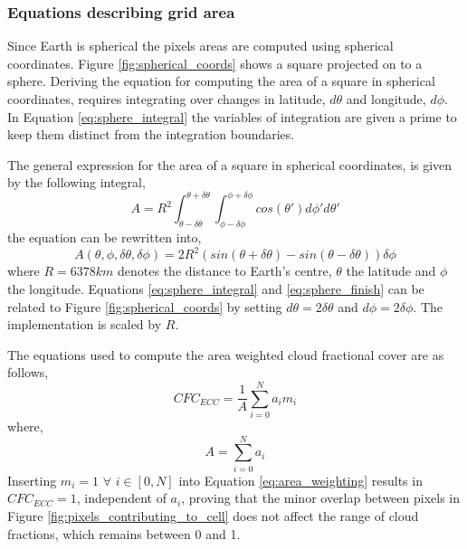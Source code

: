 \subsubsection{Equations describing grid area}
Since Earth is spherical the pixels areas are computed using spherical coordinates. Figure \ref{fig:spherical_coords} shows a square projected on to a sphere. Deriving the equation for computing the area of a square in spherical coordinates, requires integrating over changes in latitude, $d\theta$ and longitude, $d\phi$. In Equation \eqref{eq:sphere_integral} the variables of integration are given a prime to keep them distinct from the integration boundaries.

The general expression for the area of a square in spherical coordinates, is given by the following integral,
\begin{equation} \label{eq:sphere_integral}
    A = R^2\int_{ \theta - \delta \theta }^{\theta + \delta \theta} \int_{ \phi - \delta \phi }^{\phi + \delta \phi} cos\left( \theta' \right) d\phi' d\theta'
\end{equation}
the equation can be rewritten into,
\begin{equation} \label{eq:sphere_finish}
    A \left( \theta, \phi, \delta \theta, \delta \phi   \right)= 2R^2 \left( sin\left( \theta + \delta \theta  \right) - sin\left(  \theta - \delta \theta  \right) \right) \delta \phi
\end{equation}
where $R=6378km$ denotes the distance to Earth's centre, $\theta$ the latitude and $\phi$ the longitude. Equations \eqref{eq:sphere_integral} and \eqref{eq:sphere_finish} can be related to Figure \ref{fig:spherical_coords} by setting $d \theta = 2 \delta \theta$ and $d \phi = 2 \delta \phi$. The implementation is scaled by $R$.

The equations used to compute the area weighted cloud fractional cover are as follows,
\begin{equation} \label{eq:area_weighting}
    CFC_{ECC} = \frac{1}{A} \sum_{i=0}^{N} a_i m_i
\end{equation}
where,
\begin{equation} \label{eq:tot_area}
    A = \sum_{i=0}^{N} a_i
\end{equation}
Inserting $m_i = 1$ $\forall$ $i \in [0,N]$ into Equation \eqref{eq:area_weighting} results in $CFC_{ECC}=1$, independent of $a_i$, proving that the minor overlap between pixels in Figure \ref{fig:pixels_contributing_to_cell} does not affect the range of cloud fractions, which remains between 0 and 1.

